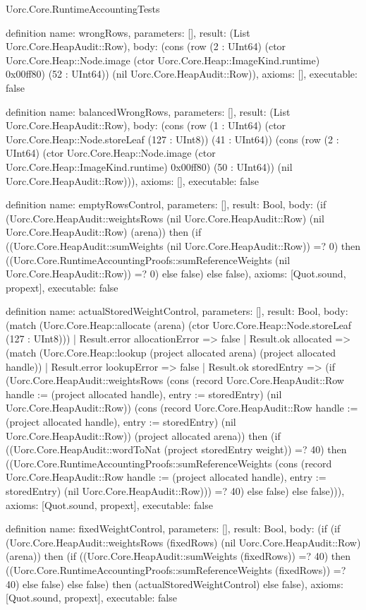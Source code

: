 \begin{lexlean}{Uorc.Core.RuntimeAccountingTests}
\begin{semanticmodule}
definition{
  name: wrongRows,
  parameters: [],
  result: (List Uorc.Core.HeapAudit::Row),
  body: (cons (row (2 : UInt64) (ctor Uorc.Core.Heap::Node.image (ctor Uorc.Core.Heap::ImageKind.runtime) 0x00ff80) (52 : UInt64)) (nil Uorc.Core.HeapAudit::Row)),
  axioms: [],
  executable: false
}

definition{
  name: balancedWrongRows,
  parameters: [],
  result: (List Uorc.Core.HeapAudit::Row),
  body: (cons (row (1 : UInt64) (ctor Uorc.Core.Heap::Node.storeLeaf (127 : UInt8)) (41 : UInt64)) (cons (row (2 : UInt64) (ctor Uorc.Core.Heap::Node.image (ctor Uorc.Core.Heap::ImageKind.runtime) 0x00ff80) (50 : UInt64)) (nil Uorc.Core.HeapAudit::Row))),
  axioms: [],
  executable: false
}

definition{
  name: emptyRowsControl,
  parameters: [],
  result: Bool,
  body: (if (Uorc.Core.HeapAudit::weightsRows (nil Uorc.Core.HeapAudit::Row) (nil Uorc.Core.HeapAudit::Row) (arena)) then (if ((Uorc.Core.HeapAudit::sumWeights (nil Uorc.Core.HeapAudit::Row)) =? 0) then ((Uorc.Core.RuntimeAccountingProofs::sumReferenceWeights (nil Uorc.Core.HeapAudit::Row)) =? 0) else false) else false),
  axioms: [Quot.sound, propext],
  executable: false
}

definition{
  name: actualStoredWeightControl,
  parameters: [],
  result: Bool,
  body: (match (Uorc.Core.Heap::allocate (arena) (ctor Uorc.Core.Heap::Node.storeLeaf (127 : UInt8)))
    | Result.error allocationError => false
    | Result.ok allocated => (match (Uorc.Core.Heap::lookup (project allocated arena) (project allocated handle))
      | Result.error lookupError => false
      | Result.ok storedEntry => (if (Uorc.Core.HeapAudit::weightsRows (cons (record Uorc.Core.HeapAudit::Row {handle := (project allocated handle), entry := storedEntry}) (nil Uorc.Core.HeapAudit::Row)) (cons (record Uorc.Core.HeapAudit::Row {handle := (project allocated handle), entry := storedEntry}) (nil Uorc.Core.HeapAudit::Row)) (project allocated arena)) then (if ((Uorc.Core.HeapAudit::wordToNat (project storedEntry weight)) =? 40) then ((Uorc.Core.RuntimeAccountingProofs::sumReferenceWeights (cons (record Uorc.Core.HeapAudit::Row {handle := (project allocated handle), entry := storedEntry}) (nil Uorc.Core.HeapAudit::Row))) =? 40) else false) else false))),
  axioms: [Quot.sound, propext],
  executable: false
}

definition{
  name: fixedWeightControl,
  parameters: [],
  result: Bool,
  body: (if (if (Uorc.Core.HeapAudit::weightsRows (fixedRows) (nil Uorc.Core.HeapAudit::Row) (arena)) then (if ((Uorc.Core.HeapAudit::sumWeights (fixedRows)) =? 40) then ((Uorc.Core.RuntimeAccountingProofs::sumReferenceWeights (fixedRows)) =? 40) else false) else false) then (actualStoredWeightControl) else false),
  axioms: [Quot.sound, propext],
  executable: false
}


\end{semanticmodule}
\end{lexlean}
